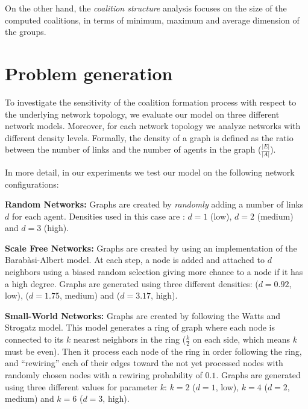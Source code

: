 \documentclass[11pt, twoside, titlepage, a4paper, openright]{report}
\begin{document}
\noindent On the other hand, the \textit{coalition structure} analysis focuses on the size of the computed coalitions, in terms of minimum, maximum and average dimension of the groups.

\section{Problem generation}
\label{sec:problem_generation}
To investigate the sensitivity of the coalition
formation process with respect to the underlying network topology, we
evaluate our model on three different network models. Moreover, for each network
topology we analyze networks with different density levels. Formally, the density of a graph is defined as the ratio between the number of links and the number of agents in the graph ($\frac{\vert E \vert}{\vert A \vert}$).

\noindent In more detail, in our experiments we test our model on the following network
configurations:

\vspace{0.1in}\noindent \textbf{Random Networks:} Graphs are created by
\emph{randomly} adding a number of links $d$ for each agent. Densities used in this case are : $d=1$
(low), $d=2$ (medium) and $d=3$ (high).

\vspace{0.1in}\noindent \textbf{Scale Free Networks:} Graphs are created by
using an implementation of the Barabàsi-Albert model. At each step, a node is added and
attached to $d$ neighbors using a biased random selection giving more chance to
a node if it has a high degree.
Graphs are generated using three different densities:
($d=0.92$, low), ($d= 1.75$, medium) and ($d=3.17$, high).

\vspace{0.1in}\noindent \textbf{Small-World Networks:} Graphs are created by
following the Watts and Strogatz model.
This model generates a ring of graph where each node is connected to its $k$
nearest neighbors in the ring ($\frac{k}{2}$ on each side, which means $k$ must be even).
Then it process each node of the ring in order following the ring, and
``rewiring'' each of their edges toward the not yet processed nodes with randomly
chosen nodes with a rewiring probability of $0.1$.
Graphs are generated using three different values for parameter $k$: $k=2$ ($d=1$,
low), $k=4$ ($d=2$, medium) and $k=6$ ($d=3$, high).
\end{document}
